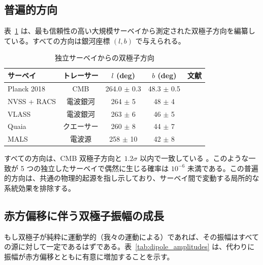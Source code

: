 \documentclass[11pt,a4paper]{article}
\begin{document}
	\subsection{普遍的方向}
	
	表~\ref{tab:dipole_directions} は、最も信頼性の高い大規模サーベイから測定された双極子方向を編纂している。すべての方向は銀河座標 \((l,b)\) で与えられる。
	
	\begin{table}[htbp]
		\centering
		\caption{独立サーベイからの双極子方向}
		\label{tab:dipole_directions}
		\begin{tabular}{lcccc}
			\toprule
			\textbf{サーベイ} & \textbf{トレーサー} & \(l\) (deg) & \(b\) (deg) & \textbf{文献} \\
			\midrule
			Planck 2018 & CMB & 264.0 \(\pm\) 0.3 & 48.3 \(\pm\) 0.5 & \cite{Planck2018VII} \\
			NVSS + RACS & 電波銀河 & 264 \(\pm\) 5 & 48 \(\pm\) 4 & \cite{Oayda2024} \\
			VLASS & 電波銀河 & 263 \(\pm\) 6 & 46 \(\pm\) 5 & \cite{Wagenveld2025} \\
			Quaia & クエーサー & 260 \(\pm\) 8 & 44 \(\pm\) 7 & \cite{Secrest2025} \\
			MALS & 電波源 & 258 \(\pm\) 10 & 42 \(\pm\) 8 & \cite{Wagenveld2025} \\
			\bottomrule
		\end{tabular}
	\end{table}
	
	すべての方向は、CMB 双極子方向と \(1.2\sigma\) 以内で一致している \cite{Oayda2024}。このような一致が 5 つの独立したサーベイで偶然に生じる確率は \(10^{-6}\) 未満である。この普遍的方向は、共通の物理的起源を指し示しており、サーベイ間で変動する局所的な系統効果を排除する。
	
	\subsection{赤方偏移に伴う双極子振幅の成長}
	
	もし双極子が純粋に運動学的（我々の運動による）であれば、その振幅はすべての源に対して一定であるはずである。表~\ref{tab:dipole_amplitudes} は、代わりに振幅が赤方偏移とともに有意に増加することを示す。
	
\end{document}
